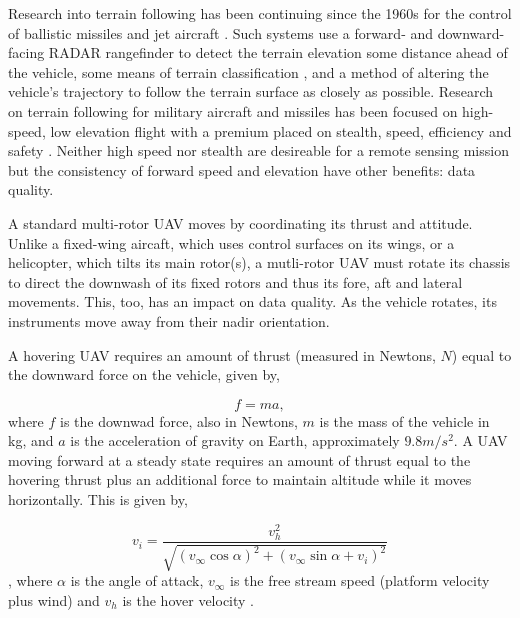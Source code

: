 \documentclass[10pt,a4paper]{report}
\begin{document}
Research into terrain following has been continuing since the 1960s for the control of ballistic missiles and jet aircraft \cite{KRACHMALNICK1968,Starling1971,Cunningham1980}. Such systems use a forward- and downward-facing RADAR rangefinder to detect the terrain elevation some distance ahead of the vehicle, some means of terrain classification \cite{Cunningham1980}, and a method of altering the vehicle's trajectory to follow the terrain surface as closely as possible. Research on terrain following for military aircraft and missiles has been focused on high-speed, low elevation flight with a premium placed on stealth, speed, efficiency and safety \cite{KRACHMALNICK1968}. Neither high speed nor stealth are desireable for a remote sensing mission but the consistency of forward speed and elevation have other benefits: data quality.

A standard multi-rotor UAV moves by coordinating its thrust and attitude. Unlike a fixed-wing aircaft, which uses control surfaces on its wings, or a helicopter, which tilts its main rotor(s), a mutli-rotor UAV must rotate its chassis to direct the downwash of its fixed rotors and thus its fore, aft and lateral movements. This, too, has an impact on data quality. As the vehicle rotates, its instruments move away from their nadir orientation. 

A hovering UAV requires an amount of thrust (measured in Newtons, $N$) equal to the downward force on the vehicle, given by, 

\begin{equation}
f = ma,
\label{eq:hover_force}
\end{equation} where $f$ is the downwad force, also in Newtons, $m$ is the mass of the vehicle in kg, and $a$ is the acceleration of gravity on Earth, approximately $9.8m/s^2$. A UAV moving forward at a steady state requires an amount of thrust equal to the hovering thrust plus an additional force to maintain altitude while it moves horizontally. This is given by,

\begin{equation}
v_i = \dfrac{ v_h^2 } { \sqrt{ (v_\infty \cos \alpha)^2 + (v_\infty \sin \alpha + v_i)^2 } } 
\label{eq:move_force}
\end{equation}, where $\alpha$ is the angle of attack, $v_\infty$ is the free stream speed (platform velocity plus wind) and $v_h$ is the hover velocity \cite{Hoffmann2007}.
\end{document}
